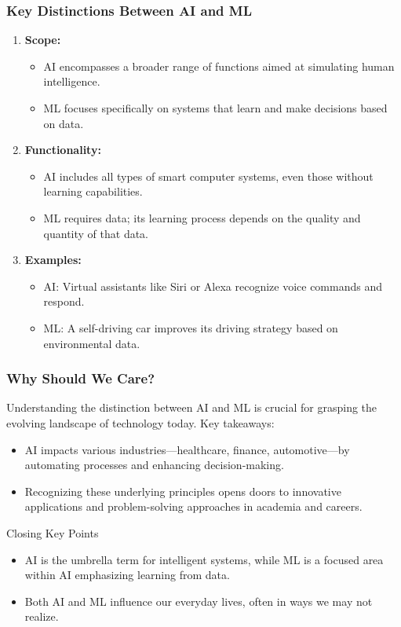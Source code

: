 \documentclass[aspectratio=169]{beamer}
\begin{document}
\begin{frame}[fragile]
    \frametitle{Key Distinctions Between AI and ML}
    \begin{enumerate}
        \item \textbf{Scope:}
            \begin{itemize}
                \item AI encompasses a broader range of functions aimed at simulating human intelligence.
                \item ML focuses specifically on systems that learn and make decisions based on data.
            \end{itemize}
        \item \textbf{Functionality:}
            \begin{itemize}
                \item AI includes all types of smart computer systems, even those without learning capabilities.
                \item ML requires data; its learning process depends on the quality and quantity of that data.
            \end{itemize}
        \item \textbf{Examples:}
            \begin{itemize}
                \item AI: Virtual assistants like Siri or Alexa recognize voice commands and respond.
                \item ML: A self-driving car improves its driving strategy based on environmental data.
            \end{itemize}
    \end{enumerate}
\end{frame}

\begin{frame}[fragile]
    \frametitle{Why Should We Care?}
    Understanding the distinction between AI and ML is crucial for grasping the evolving landscape of technology today. Key takeaways:
    \begin{itemize}
        \item AI impacts various industries—healthcare, finance, automotive—by automating processes and enhancing decision-making.
        \item Recognizing these underlying principles opens doors to innovative applications and problem-solving approaches in academia and careers.
    \end{itemize}
    
    \begin{block}{Closing Key Points}
        \begin{itemize}
            \item AI is the umbrella term for intelligent systems, while ML is a focused area within AI emphasizing learning from data.
            \item Both AI and ML influence our everyday lives, often in ways we may not realize.
        \end{itemize}
    \end{block}
\end{frame}
\end{document}
